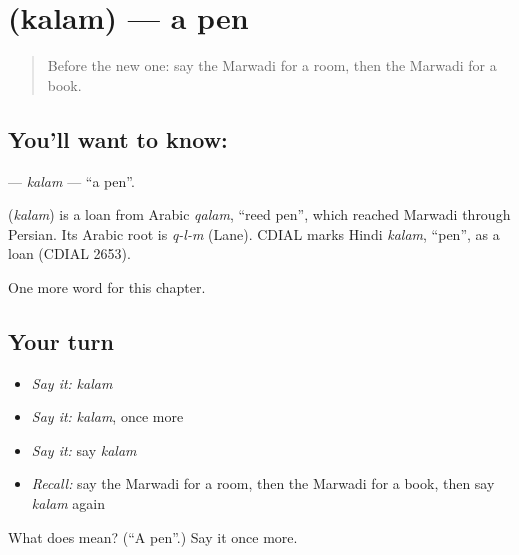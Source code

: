 \section[\texorpdfstring{\mw{कलम} (kalam)}{कलम (kalam)}]{ (kalam) — a pen}

\label{lesson:MW-C65-kalam}



\begin{quote}
Before the new one: say the Marwadi for a room, then the Marwadi for a book.
\end{quote}

\subsection*{You'll want to know: }
\textbf{} — \emph{kalam} — \textquotedblleft{}a pen\textquotedblright{}.

\begin{cousinweb}
\textbf{} (\emph{kalam}) is a loan from Arabic \emph{qalam}, \textquotedblleft{}reed pen\textquotedblright{}, which reached Marwadi through Persian. Its Arabic root is \emph{q-l-m} (Lane). CDIAL marks Hindi \emph{kalam}, \textquotedblleft{}pen\textquotedblright{}, as a loan (CDIAL 2653).
\end{cousinweb}

\begin{grammarlens}[title={What you've built}]
One more word for this chapter.
\end{grammarlens}

\subsection*{Your turn}
\begin{itemize}
\raggedright
  \item \emph{Say it:} \emph{kalam}
  \item \emph{Say it:} \emph{kalam}, once more
  \item \emph{Say it:} say \emph{kalam}
  \item \emph{Recall:} say the Marwadi for a room, then the Marwadi for a book, then say \emph{kalam} again
\end{itemize}

\begin{tcolorbox}[breakable,colback=teal!4,colframe=teal!35!black,title={Before you move on}]
What does  mean? (\textquotedblleft{}A pen\textquotedblright{}.) Say it once more.
\end{tcolorbox}

